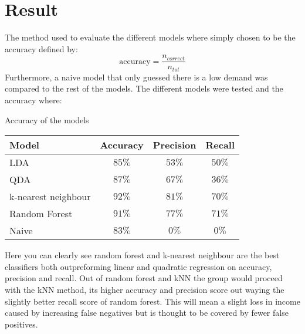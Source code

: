 \section{Result}

The method used to evaluate the different models where simply chosen to be the accuracy defined by:
\begin{equation*}
    \text{accuracy} = \frac{n_{correct}}{n_{tot}}
\end{equation*}
Furthermore, a naive model that only guessed there is a low demand was compared to the rest of the models.
The different models were tested and the accuracy where:
\\
\begin{table*}[h]
    \begin{center}
        Accuracy of the models
        \\
        \begin{tabular}{|l|c|c|c|}
            \hline
            Model & Accuracy & Precision & Recall \\
            \hline
            LDA & $85\%$ & $53\%$ & $50\%$ \\
            QDA & $87\%$ & $67\%$ & $36\%$ \\
            k-nearest neighbour & $92\%$ & $81\%$ & $70\%$ \\
            Random Forest & $91\%$ & $77\%$ &$71\%$ \\
            Naive & $83\%$ & $0\%$ & $0\%$ \\
            \hline
        \end{tabular}
    \end{center}
\end{table*}
Here you can clearly see random forest and k-nearest neighbour are the best classifiers both outpreforming linear and quadratic regression on accuracy, precision and recall.
Out of random forest and kNN the group would proceed with the kNN method, its higher accuracy and precision score out waying the slightly better recall score of random forest. 
This will mean a slight loss in income caused by increasing false negatives but is thought to be covered by fewer false positives.
